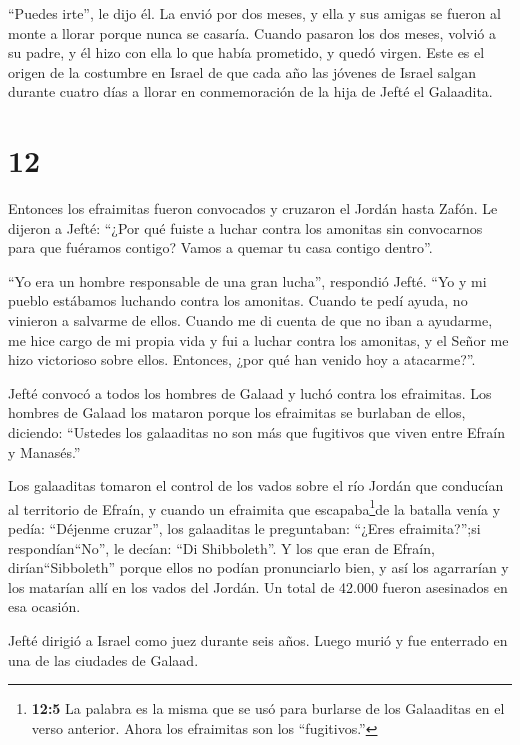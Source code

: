  ``Puedes irte'', le dijo él. La envió por dos meses, y
ella y sus amigas se fueron al monte a llorar porque nunca se casaría.
 Cuando pasaron los dos meses, volvió a su padre, y él hizo
con ella lo que había prometido, y quedó virgen. Este es el origen de la
costumbre en Israel  de que cada año las jóvenes de Israel
salgan durante cuatro días a llorar en conmemoración de la hija de Jefté
el Galaadita.

\hypertarget{section-11}{%
\section{12}\label{section-11}}

 Entonces los efraimitas fueron convocados y cruzaron el
Jordán hasta Zafón. Le dijeron a Jefté: ``¿Por qué fuiste a luchar
contra los amonitas sin convocarnos para que fuéramos contigo? Vamos a
quemar tu casa contigo dentro''.

 ``Yo era un hombre responsable de una gran lucha'',
respondió Jefté. ``Yo y mi pueblo estábamos luchando contra los
amonitas. Cuando te pedí ayuda, no vinieron a salvarme de ellos.
 Cuando me di cuenta de que no iban a ayudarme, me hice
cargo de mi propia vida y fui a luchar contra los amonitas, y el Señor
me hizo victorioso sobre ellos. Entonces, ¿por qué han venido hoy a
atacarme?''.

 Jefté convocó a todos los hombres de Galaad y luchó contra
los efraimitas. Los hombres de Galaad los mataron porque los efraimitas
se burlaban de ellos, diciendo: ``Ustedes los galaaditas no son más que
fugitivos que viven entre Efraín y Manasés.''

 Los galaaditas tomaron el control de los vados sobre el río
Jordán que conducían al territorio de Efraín, y cuando un efraimita que
escapaba\footnote{\textbf{12:5} La palabra es la misma que se usó para
  burlarse de los Galaaditas en el verso anterior. Ahora los efraimitas
  son los ``fugitivos.''}de la batalla venía y pedía: ``Déjenme
cruzar'', los galaaditas le preguntaban: ``¿Eres efraimita?'';si
respondían``No'',  le decían: ``Di Shibboleth''. Y los que
eran de Efraín, dirían``Sibboleth'' porque ellos no podían pronunciarlo
bien, y así los agarrarían y los matarían allí en los vados del Jordán.
Un total de 42.000 fueron asesinados en esa ocasión.

 Jefté dirigió a Israel como juez durante seis años. Luego
murió y fue enterrado en una de las ciudades de Galaad.

